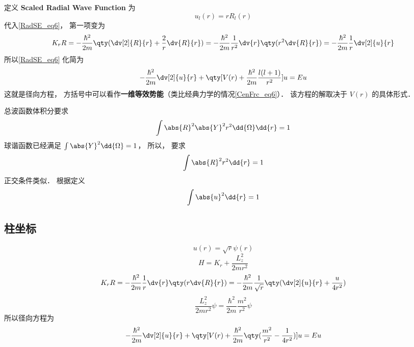 定义 \textbf{Scaled Radial Wave Function} 为
\begin{equation}
u_l(r) = r R_l(r)
\end{equation}
代入\autoref{RadSE_eq6}， 第一项变为
\begin{equation}
K_r R =  - \frac{\hbar^2}{2m} \qty(\dv[2]{R}{r} + \frac2r \dv{R}{r}) = -\frac{\hbar^2}{2m}\frac{1}{r^2} \dv{r} \qty(r^2\dv{R}{r}) =  - \frac{\hbar^2}{2m}\frac1r \dv[2]{u}{r}
\end{equation}
所以\autoref{RadSE_eq6} 化简为
\begin{equation}\label{RadSE_eq1}
-\frac{\hbar^2}{2m} \dv[2]{u}{r} + \qty[V(r) + \frac{\hbar^2}{2m}\frac{l(l + 1)}{r^2}]u = Eu
\end{equation}
这就是径向方程， 方括号中可以看作\textbf{一维等效势能}（类比经典力学的情况\autoref{CenFrc_eq6}）． 该方程的解取决于 $V(r)$ 的具体形式．


总波函数体积分要求
\begin{equation}
\int \abs{R}^2 \abs{Y}^2 r^2 \dd{\Omega}\dd{r}  = 1
\end{equation}
球谐函数已经满足 $\int \abs{Y}^2 \dd{\Omega} = 1$，  所以， 要求
\begin{equation}
\int \abs{R}^2 r^2 \dd{r}  = 1
\end{equation}
正交条件类似． 根据定义
\begin{equation}
\int \abs{u}^2 \dd{r}  = 1
\end{equation}

\subsection{柱坐标}
\begin{equation}
u(r) = \sqrt r \psi (r)
\end{equation}
\begin{equation}
 H = K_r + \frac{L_z^2}{2m r^2}
\end{equation}
\begin{equation}
K_r R = -\frac{\hbar^2}{2m} \frac1r \dv{r} \qty(r \dv{R}{r}) =  - \frac{\hbar^2}{2m} \frac{1}{\sqrt r} \qty(\dv[2]{u}{r} + \frac{u}{4 r^2})
\end{equation}
\begin{equation}
\frac{L_z^2}{2m r^2}\psi  = \frac{\hbar^2}{2m} \frac{m^2}{r^2}\psi 
\end{equation}
所以径向方程为
\begin{equation}
- \frac{\hbar^2}{2m} \dv[2]{u}{r} + \qty[V(r) + \frac{\hbar^2}{2m} \qty(\frac{m^2}{r^2} - \frac{1}{4 r^2})]u = Eu
\end{equation}

